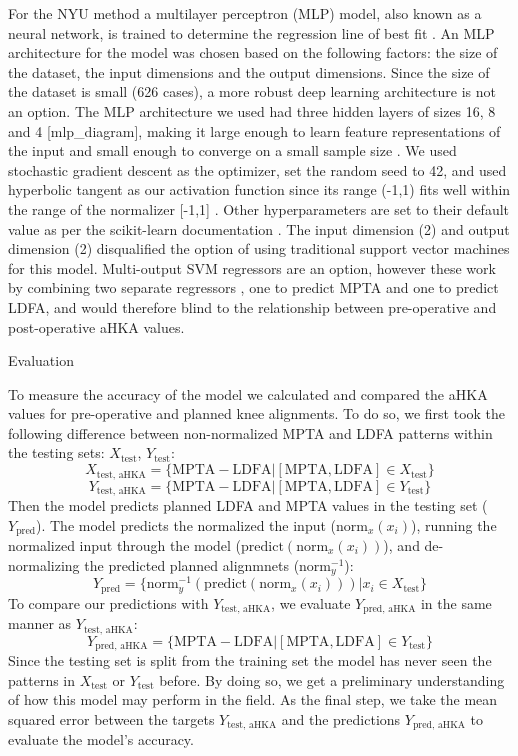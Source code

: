 \documentclass{article}
\begin{document}
	For the NYU method a multilayer perceptron (MLP) model, also known as a neural network, is trained to determine the regression line of best fit \cite{mlp-paper}.
An MLP architecture for the model was chosen based on the following factors: the size of the dataset, the input dimensions and the output dimensions.
Since the size of the dataset is small (626 cases), a more robust deep learning architecture is not an option.
The MLP architecture we used had three hidden layers of sizes 16, 8 and 4 [mlp\_diagram],
making it large enough to learn feature representations of the input and small enough to converge on a small sample size \cite{deep-learning-paper}.
We used stochastic gradient descent as the optimizer, set the random seed to 42, and used hyperbolic tangent as our activation function since its range (-1,1)
fits well within the range of the normalizer [-1,1] \cite{sgd-paper, mlp-paper}.
Other hyperparameters are set to their default value as per the scikit-learn documentation \cite{sklearn-sgd, adaptive-lr, scikit-learn, momentum-paper}.
The input dimension (2) and output dimension (2) disqualified the option of using traditional support vector machines for this model.
Multi-output SVM regressors are an option, however these work by combining two separate regressors \cite{svm-paper},
one to predict MPTA and one to predict LDFA, and would therefore blind to the relationship between pre-operative and post-operative aHKA values. 

Evaluation

	To measure the accuracy of the model we calculated and compared the aHKA values for pre-operative and planned knee alignments.
To do so, we first took the following difference between non-normalized MPTA and LDFA patterns within the testing sets: 
$X_\text{test}$, $Y_\text{test}$: 
$$X_\text{test, aHKA}=\{\text{MPTA} - \text{LDFA} | [\text{MPTA}, \text{LDFA}] \in X_\text{test}\}$$
$$Y_\text{test, aHKA}=\{\text{MPTA} - \text{LDFA} | [\text{MPTA}, \text{LDFA}] \in Y_\text{test}\}$$
Then the model predicts planned LDFA and MPTA values in the testing set ($Y_\text{pred}$). 
The model predicts the normalized the input ($\text{norm}_x(x_i)$), running the normalized input through the model ($\text{predict}(\text{norm}_x(x_i))$),
and de-normalizing the predicted planned alignmnets ($\text{norm}_y^{-1}$):
$$Y_\text{pred}=\{\text{norm}_y^{-1}(\text{predict}(\text{norm}_x(x_i))) | x_i \in X_\text{test}\}$$
To compare our predictions with $Y_\text{test, aHKA}$, we evaluate $Y_\text{pred, aHKA}$ in the same manner as $Y_\text{test, aHKA}$: 
$$Y_\text{pred, aHKA}=\{\text{MPTA} - \text{LDFA} | [\text{MPTA}, \text{LDFA}] \in Y_\text{test}\}$$
Since the testing set is split from the training set the model has never seen the patterns in $X_\text{test}$ or $Y_\text{test}$ before.
By doing so, we get a preliminary understanding of how this model may perform in the field.
As the final step, we take the mean squared error between the targets $Y_\text{test, aHKA}$ and the predictions $Y_\text{pred, aHKA}$ to evaluate the model's accuracy.
\end{document}
